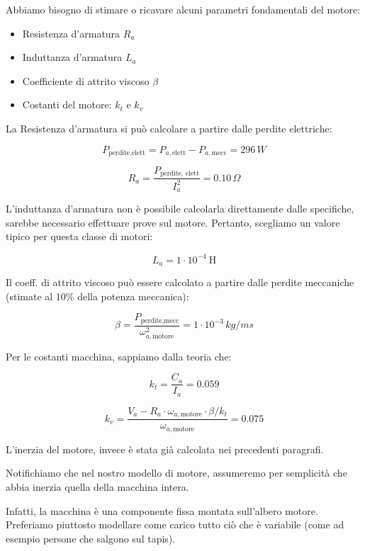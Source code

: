 \documentclass[a4paper,12pt]{article}
\begin{document}
Abbiamo bisogno di stimare o ricavare alcuni parametri fondamentali del motore:

\begin{itemize}
    \item Resistenza d'armatura \( R_a \)
    \item Induttanza d'armatura \( L_a \)
    \item Coefficiente di attrito viscoso \( \beta \)
    \item Costanti del motore: \( k_t \) e \( k_v \)
\end{itemize}

\vspace{0.5cm}
La Resistenza d'armatura si può calcolare a partire dalle perdite elettriche:

\[
    P_{\text{perdite,elett}} = P_{a, \text{elett}} - P_{a, \text{mecc}} = 296\,W
\]

\[
    R_a = \frac{P_{\text{perdite, elett}}}{I_a^2}=0.10\,\Omega
\]
\vspace{0.5cm}

L'induttanza d'armatura non è possibile calcolarla direttamente dalle specifiche, sarebbe necessario effettuare prove sul motore. Pertanto, scegliamo un valore tipico per questa classe di motori:

\[
    L_a = 1 \cdot 10^{-4} \ \text{H}
\]

\vspace{0.5cm}

Il coeff. di attrito viscoso può essere calcolato a partire dalle perdite meccaniche (stimate al 10\% della potenza meccanica):

\[
    \beta = \frac{P_{\text{perdite,mecc}}}{\omega_{a, \text{motore}}^2}=1 \cdot 10^{-3}\,kg/ms
\]

\vspace{0.5cm}
Per le costanti macchina, sappiamo dalla teoria che:

\[
    k_t = \frac{C_a}{I_a}=0.059
\]

\[
    k_v = \frac{V_a - R_a \cdot \omega_{a, \text{motore}} \cdot \beta / k_t}{\omega_{a, \text{motore}}}=0.075
\]

\vspace{0.5cm}
L'inerzia del motore, invece è stata già calcolata nei precedenti paragrafi.

Notifichiamo che nel nostro modello di motore, assumeremo per semplicità che abbia inerzia quella della macchina intera.

Infatti, la macchina è una componente fissa montata sull'albero motore. Preferiamo piuttosto modellare come carico tutto ciò che è variabile (come ad esempio persone che salgono sul tapis).
\end{document}
